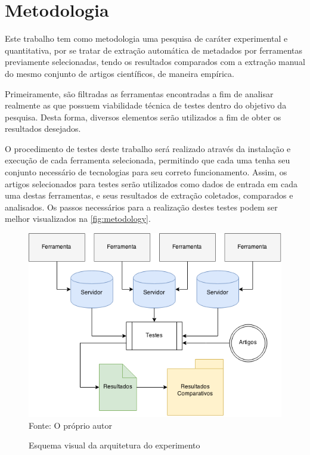 
\chapter{Metodologia}
\label{cha:methodology}

Este trabalho tem como metodologia uma pesquisa de caráter experimental e quantitativa, por se tratar de extração automática de metadados por ferramentas previamente selecionadas, tendo os resultados comparados com a extração manual do mesmo conjunto de artigos científicos, de maneira empírica.


Primeiramente, são filtradas as ferramentas encontradas a fim de analisar realmente as que possuem viabilidade técnica de testes dentro do objetivo da pesquisa. Desta forma, diversos elementos serão utilizados a fim de obter os resultados desejados.


O procedimento de testes deste trabalho será realizado através da instalação e execução de cada ferramenta selecionada, permitindo que cada uma tenha seu conjunto necessário de tecnologias para seu correto funcionamento. Assim, os artigos selecionados para testes serão utilizados como dados de entrada em cada uma destas ferramentas, e seus resultados de extração coletados, comparados e analisados. Os passos necessários para a realização destes testes podem ser melhor visualizados na \autoref{fig:metodology}.

\begin{figure}
    \centering
    \caption{Esquema visual da arquitetura do experimento}
    \label{fig:metodology}
    \includegraphics[width=0.8\linewidth]{./assets/images/metodology}
    \center\footnotesize{Fonte: O próprio autor}
\end{figure}


